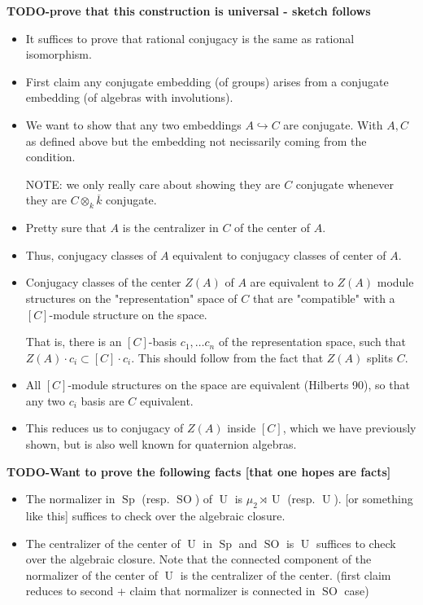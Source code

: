 \documentclass{article}
\theoremstyle{plain}
\theoremstyle{definition}
\numberwithin{equation}{section}
\DeclareMathOperator{\Sp}{Sp}
\DeclareMathOperator{\SO}{SO}
\DeclareMathOperator{\U}{U}
\newcommand{\TODO}[1]{\textbf{TODO-#1}}
\begin{document}
\TODO{prove that this construction is universal - sketch follows}
\begin{itemize}
\item It suffices to prove that rational conjugacy is the same as rational isomorphism.
\item First claim any conjugate embedding (of groups) arises from a conjugate embedding (of algebras with involutions).
\item We want to show that any two embeddings $A \hookrightarrow C$ are conjugate.
        With $A,C$ as defined above but the embedding not necissarily coming from the condition.

        NOTE: we only really care about showing they are $C$ conjugate whenever they are $C\otimes_k \overline{k}$ conjugate.
\item Pretty sure that $A$ is the centralizer in $C$ of the center of $A$.
\item Thus, conjugacy classes of $A$ equivalent to conjugacy classes of center of $A$.
\item Conjugacy classes of the center $Z(A)$ of $A$ are equivalent to $Z(A)$ module structures on the "representation" space of $C$ that are "compatible" with a 
         $[C]$-module structure on the space.

          That is, there is an $[C]$-basis $c_1,\ldots c_n$ of the representation space, such that $Z(A) \cdot c_i \subset [C]\cdot c_i$.
          This should follow from the fact that $Z(A)$ splits $C$.
\item All $[C]$-module structures on the space are equivalent (Hilberts 90), so that any two $c_i$ basis are $C$ equivalent.
\item This reduces us to conjugacy of $Z(A)$ inside $[C]$, which we have previously shown, but is also well known for quaternion algebras.
\end{itemize}

\TODO{Want to prove the following facts [that one hopes are facts]}
\begin{itemize}
\item The normalizer in $\Sp$ (resp. $\SO$) of $\U$ is $\mu_2 \rtimes \U$ (resp. $\U$).  [or something like this]
\subitem  suffices to check over the algebraic closure.
\item The centralizer of the center of $\U$ in $\Sp$ and $\SO$ is $\U$
\subitem suffices to check over the algebraic closure.
\subitem Note that the connected component of the normalizer of the center of $\U$ is the centralizer of the center.
              (first claim reduces to second + claim that normalizer is connected in $\SO$ case)
\end{itemize}
\end{document}
